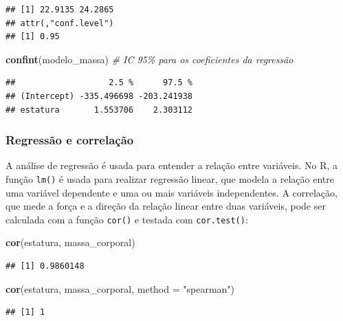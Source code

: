 \documentclass[
]{book}
\newenvironment{Shaded}{\begin{snugshade}}{\end{snugshade}}
\newcommand{\AttributeTok}[1]{\textcolor[rgb]{0.13,0.29,0.53}{#1}}
\newcommand{\CommentTok}[1]{\textcolor[rgb]{0.56,0.35,0.01}{\textit{#1}}}
\newcommand{\FunctionTok}[1]{\textcolor[rgb]{0.13,0.29,0.53}{\textbf{#1}}}
\newcommand{\NormalTok}[1]{#1}
\newcommand{\StringTok}[1]{\textcolor[rgb]{0.31,0.60,0.02}{#1}}
\begin{document}
\begin{verbatim}
## [1] 22.9135 24.2865
## attr(,"conf.level")
## [1] 0.95
\end{verbatim}

\begin{Shaded}
\begin{Highlighting}[]
\FunctionTok{confint}\NormalTok{(modelo\_massa)            }\CommentTok{\# IC 95\% para os coeficientes da regressão}
\end{Highlighting}
\end{Shaded}

\begin{verbatim}
##                   2.5 %      97.5 %
## (Intercept) -335.496698 -203.241938
## estatura       1.553706    2.303112
\end{verbatim}

\subsubsection{Regressão e correlação}\label{regressuxe3o-e-correlauxe7uxe3o}

A análise de regressão é usada para entender a relação entre variáveis. No R, a função \texttt{lm()} é usada para realizar regressão linear, que modela a relação entre uma variável dependente e uma ou mais variáveis independentes. A correlação, que mede a força e a direção da relação linear entre duas variáveis, pode ser calculada com a função \texttt{cor()} e testada com \texttt{cor.test()}:

\begin{Shaded}
\begin{Highlighting}[]
\FunctionTok{cor}\NormalTok{(estatura, massa\_corporal)}
\end{Highlighting}
\end{Shaded}

\begin{verbatim}
## [1] 0.9860148
\end{verbatim}

\begin{Shaded}
\begin{Highlighting}[]
\FunctionTok{cor}\NormalTok{(estatura, massa\_corporal, }\AttributeTok{method =} \StringTok{"spearman"}\NormalTok{)}
\end{Highlighting}
\end{Shaded}

\begin{verbatim}
## [1] 1
\end{verbatim}
\end{document}
